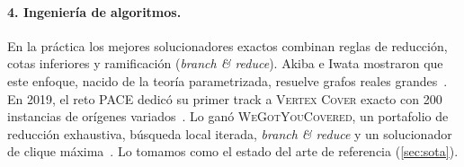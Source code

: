 \paragraph{4. Ingeniería de algoritmos.} En la práctica los mejores solucionadores exactos combinan reglas de reducción, cotas inferiores y ramificación (\emph{branch \& reduce}). Akiba e Iwata mostraron que este enfoque, nacido de la teoría parametrizada, resuelve grafos reales grandes~\citep{akiba2016}. En 2019, el reto PACE dedicó su primer track a \textsc{Vertex Cover} exacto con 200 instancias de orígenes variados~\citep{dzulfikar2019}. Lo ganó \textsc{WeGotYouCovered}, un portafolio de reducción exhaustiva, búsqueda local iterada, \emph{branch \& reduce} y un solucionador de clique máxima~\citep{hespe2020}. Lo tomamos como el estado del arte de referencia (\cref{sec:sota}).

